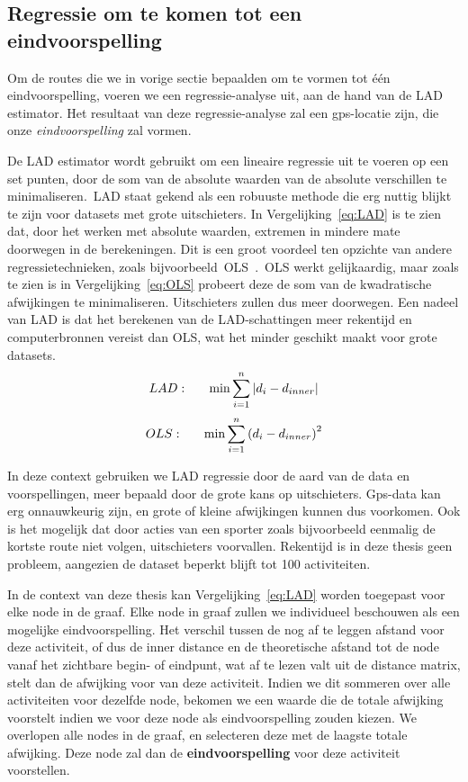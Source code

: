 \subsection{Regressie om te komen tot een eindvoorspelling}\label{sec:lad}
Om de routes die we in vorige sectie bepaalden om te vormen tot één
eindvoorspelling, voeren we een regressie-analyse uit, aan de hand van de
\ac{LAD} estimator. Het resultaat van deze regressie-analyse zal een
\ac{gps}-locatie zijn, die onze \textit{eindvoorspelling} zal vormen.

De \ac{LAD} estimator wordt gebruikt om een lineaire regressie uit te voeren op
een set punten, door de som van de absolute waarden van de absolute verschillen
te minimaliseren.\ \ac{LAD} staat gekend als een robuuste methode die erg
nuttig blijkt te zijn voor datasets met grote uitschieters. In
Vergelijking~\ref{eq:LAD} is te zien dat, door het werken met absolute waarden,
extremen in mindere mate doorwegen in de berekeningen. Dit is een groot
voordeel ten opzichte van andere regressietechnieken, zoals
bijvoorbeeld~\ac{OLS}~\cite{iqbal2021application}.~\ac{OLS} werkt gelijkaardig,
maar zoals te zien is in Vergelijking~\ref{eq:OLS} probeert deze de som van de
kwadratische afwijkingen te minimaliseren. Uitschieters zullen dus meer
doorwegen. Een nadeel van \ac{LAD} is dat het berekenen van de LAD-schattingen
meer rekentijd en computerbronnen vereist dan \ac{OLS}, wat het minder geschikt
maakt voor grote datasets.
\begin{equation} \label{eq:LAD}
    LAD:\indent  \min\sum\limits_{i=1}^n|d_i - d_{inner}|
\end{equation}
\begin{equation} \label{eq:OLS}
    OLS:\indent  \min\sum\limits_{i=1}^n{(d_i - d_{inner})}^2
\end{equation}

In deze context gebruiken we LAD regressie door de aard van de data en
voorspellingen, meer bepaald door de grote kans op uitschieters. Gps-data kan
erg onnauwkeurig zijn, en grote of kleine afwijkingen kunnen dus voorkomen. Ook
is het mogelijk dat door acties van een sporter zoals bijvoorbeeld eenmalig de
kortste route niet volgen, uitschieters voorvallen. Rekentijd is in deze thesis
geen probleem, aangezien de dataset beperkt blijft tot 100 activiteiten.

In de context van deze thesis kan Vergelijking~\ref{eq:LAD} worden toegepast
voor elke node in de graaf. Elke node in graaf zullen we individueel beschouwen
als een mogelijke eindvoorspelling. Het verschil tussen de nog af te leggen
afstand voor deze activiteit, of dus de inner distance en de theoretische
afstand tot de node vanaf het zichtbare begin- of eindpunt, wat af te lezen
valt uit de distance matrix, stelt dan de afwijking voor van deze activiteit.
Indien we dit sommeren over alle activiteiten voor dezelfde node, bekomen we
een waarde die de totale afwijking voorstelt indien we voor deze node als
eindvoorspelling zouden kiezen. We overlopen alle nodes in de graaf, en
selecteren deze met de laagste totale afwijking. Deze node zal dan de
\textbf{eindvoorspelling} voor deze activiteit voorstellen.

